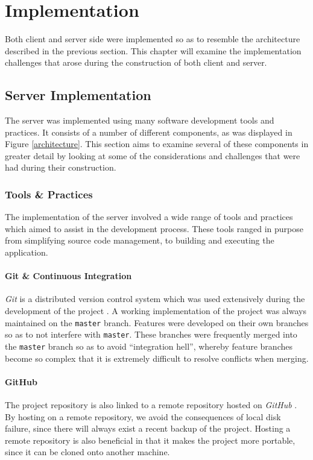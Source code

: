 \documentclass{l4proj}
\newcommand{\code}[1]{\texttt{#1}}
\begin{document}
\chapter{Implementation}
                    
Both client and server side were implemented so as to resemble the architecture described in the previous section. This chapter will examine the implementation challenges that arose during the construction of both client and server.

\section{Server Implementation}

    The server was implemented using many software development tools and practices. It consists of a number of different components, as was displayed in Figure \ref{architecture}. This section aims to examine several of these components in greater detail by looking at some of the considerations and challenges that were had during their construction.

    \subsection{Tools \& Practices}
    The implementation of the server involved a wide range of tools and practices which aimed to assist in the development process. These tools ranged in purpose from simplifying source code management, to building and executing the application.
    
             \subsubsection{Git \& Continuous Integration}
         \textit{Git} is a distributed version control system which was used extensively during the development of the project \cite{git}. A working implementation of the project was always maintained on the \code{master} branch. Features were developed on their own branches so as to not interfere with \code{master}. These branches were frequently merged into the \code{master} branch so as to avoid ``integration hell'', whereby feature branches become so complex that it is extremely difficult to resolve conflicts when merging.
         
             \subsubsection{GitHub}
             The project repository is also linked to a remote repository hosted on \textit{GitHub} \cite{github}. By hosting on a remote repository, we avoid the consequences of local disk failure, since there will always exist a recent backup of the project. Hosting a remote repository is also beneficial in that it makes the project more portable, since it can be cloned onto another machine.
             
\end{document}
